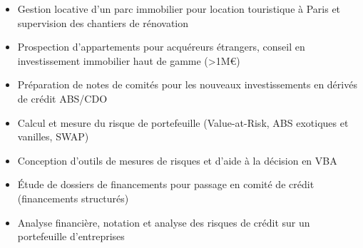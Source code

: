 \documentclass[10pt,a4paper,ragged2e,withhyper]{altacv}
\begin{document}
\begin{paracol}{2}
\divider

\begin{itemize}
\item Gestion locative d'un parc immobilier pour location touristique à Paris et supervision des chantiers de rénovation
\item Prospection d'appartements pour acquéreurs étrangers, conseil en investissement immobilier haut de gamme (>1M€)
\end{itemize}

\divider

\begin{itemize}
\item Préparation de notes de comités pour les nouveaux investissements en dérivés de crédit ABS/CDO
\item Calcul et mesure du risque de portefeuille (Value-at-Risk, ABS exotiques et vanilles, SWAP)
\item Conception d'outils de mesures de risques et d'aide à la décision en VBA
\end{itemize}

\divider

\begin{itemize}
\item Étude de dossiers de financements pour passage en comité de crédit (financements structurés)
\item Analyse financière, notation et analyse des risques de crédit sur un portefeuille d'entreprises
\end{itemize}



\switchcolumn



\end{paracol}
\end{document}
